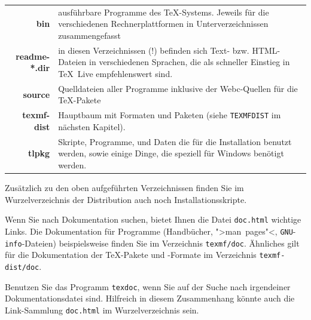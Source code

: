 \documentclass[12pt,ngerman,a4paper,fullparskip]{report}
\newcommand{\TL}{\TeX\ Live\xspace}
\newcommand{\acro}[1]{\texttt{#1}}
\newcommand{\cmdname}[1]{\texttt{#1}}
\newcommand{\OnCD}[1]{\texttt{#1}}
\newcommand{\filename}[1]{\texttt{#1}}
\begin{document}
\begin{center}
\begin{tabular}{rp{}}
\textbf{bin}        &  ausführbare Programme des \TeX-Systems. Jeweils für die verschiedenen Rechnerplattformen
              in Unterverzeichnissen zusammengefasst\\
\textbf{readme-*.dir} & in diesen Verzeichnissen (!) befinden sich Text- bzw. HTML-Dateien
              in verschiedenen Sprachen, die als schneller
              Einstieg in \TL empfehlenswert sind.\\
\textbf{source}     &  Quelldateien aller Programme inklusive der
              Webc-Quellen für die \TeX-Pakete\\
\textbf{texmf-dist} &  Hauptbaum mit Formaten und Paketen (siehe \texttt{TEXMFDIST} im nächsten Kapitel).\\
\textbf{tlpkg}      &  Skripte, Programme, und Daten die für die Installation benutzt werden, sowie einige Dinge, die speziell für Windows benötigt werden.

\end{tabular}
\end{center}

Zusätzlich zu den oben aufgeführten Verzeichnissen finden Sie
im Wurzelverzeichnis der Distribution auch noch Installationsskripte.

Wenn Sie nach Dokumentation suchen, bietet Ihnen die Datei \OnCD{doc.html} wichtige Links.
Die Dokumentation für Programme (Handbücher, ">man~pages"<, \acro{GNU}-\acro{info}-Dateien) beispielsweise finden Sie 
im Verzeichnis \OnCD{texmf/doc}. Ähnliches 
gilt für die Dokumentation der \TeX-Pakete und -Formate im Verzeichnis \OnCD{texmf-dist/doc}. 

Benutzen Sie das Programm \cmdname{texdoc}, wenn Sie auf der Suche nach irgendeiner 
Dokumentationsdatei sind. Hilfreich in diesem Zusammenhang könnte auch die Link-Sammlung \filename{doc.html} im Wurzelverzeichnis sein.
\end{document}
